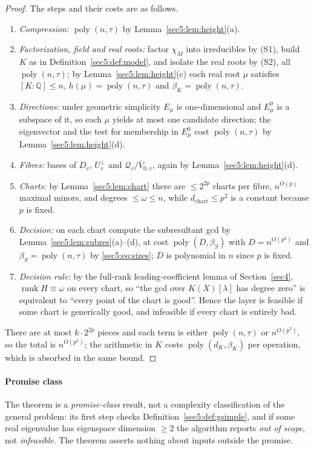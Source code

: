 \documentclass[journal]{IEEEtran}
\theoremstyle{plainn}
\theoremstyle{remark}
\newcommand{\rank}{\operatorname{rank}}
\newcommand{\poly}{\operatorname{poly}}
\begin{document}
\begin{proof}
The steps and their costs are as follows.
\begin{enumerate}[label=(\arabic*),leftmargin=*]
\item \emph{Compression:} $\poly(n,\tau)$ by Lemma~\ref{sec5:lem:height}(a).
\item \emph{Factorization, field and real roots:} factor $\chi_M$ into irreducibles by (S1), build $K$
as in Definition~\ref{sec5:def:model}, and isolate the real roots by (S2), all $\poly(n,\tau)$; by
Lemma~\ref{sec5:lem:height}(c) each real root $\mu$ satisfies $[K:\mathbb{Q}]\le n$,
$h(\mu)=\poly(n,\tau)$ and $\beta_K=\poly(n,\tau)$.
\item \emph{Directions:} under geometric simplicity $E_\mu$ is one-dimensional and $E_\mu^0$ is a
subspace of it, so each $\mu$ yields at most one candidate direction; the eigenvector and the test for
membership in $E_\mu^0$ cost $\poly(n,\tau)$ by Lemma~\ref{sec5:lem:height}(d).
\item \emph{Fibres:} bases of $D_v$, $U_v^\perp$ and $\mathcal{Q}_v/\overline{V}_{0,v}$, again by
Lemma~\ref{sec5:lem:height}(d).
\item \emph{Charts:} by Lemma~\ref{sec5:lem:chart} there are $\le2^{2p}$ charts per fibre,
$n^{O(p)}$ maximal minors, and degrees $\le\omega\le n$, while $d_{\mathrm{chart}}\le p^{2}$ is a
constant because $p$ is fixed.
\item \emph{Decision:} on each chart compute the subresultant gcd by
Lemma~\ref{sec5:lem:subres}(a)--(d), at cost $\poly(D,\beta_S)$ with $D=n^{O(p^{2})}$ and
$\beta_S=\poly(n,\tau)$ by \eqref{sec5:eq:sizes}; $D$ is polynomial in $n$ since $p$ is fixed.
\item \emph{Decision rule:} by the full-rank leading-coefficient lemma of Section~\ref{sec4},
$\rank H\equiv\omega$ on every chart, so ``the gcd over $K(X)[\lambda]$ has degree zero'' is equivalent
to ``every point of the chart is good''. Hence the layer is feasible if some chart is generically
good, and infeasible if every chart is entirely bad.
\end{enumerate}
There are at most $k\cdot2^{2p}$ pieces and each term is either $\poly(n,\tau)$ or $n^{O(p^{2})}$, so
the total is $n^{O(p^{2})}$; the arithmetic in $K$ costs $\poly(d_K,\beta_K)$ per operation, which is
absorbed in the same bound.
\end{proof}

\paragraph{Promise class} The theorem is a \emph{promise-class} result, not a complexity
classification of the general problem: its first step checks Definition~\ref{sec5:def:gsimple}, and if
some real eigenvalue has eigenspace dimension $\ge2$ the algorithm reports \emph{out of scope}, not
\emph{infeasible}. The theorem asserts nothing about inputs outside the promise.
\end{document}
